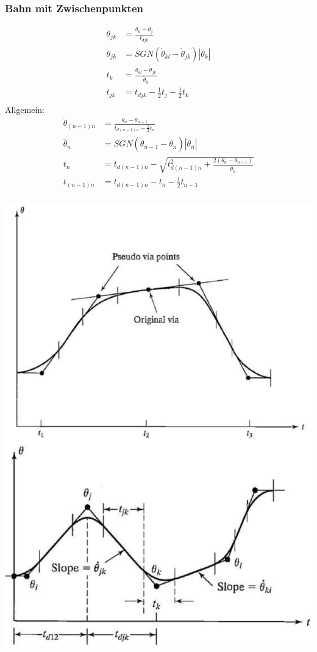 \subsubsection{Bahn mit Zwischenpunkten}
\begin{minipage}{0.5\linewidth}
    \begin{align*}
    \dot{\theta}_{jk} &= \frac{\theta_k - \theta_j}{t_{djk}}\\
    \ddot{\theta}_{jk} &= SGN(\dot{\theta}_{kl}-\dot{\theta}_{jk})|\ddot{\theta}_k|\\
    t_k &= \frac{\dot{\theta}_{kl}- \dot{\theta}_{jk}}{\ddot{\theta}_k}\\
    t_{jk}&=t_{djk}-\frac{1}{2}t_j - \frac{1}{2}t_k\\
    \end{align*}
    Allgemein:
    \begin{align*}
    \dot{\theta}_{(n-1)n} &= \frac{\theta_n - \theta_{n-1}}{t_{d(n-1)n}-\frac{1}{2}t_n}\\
    \ddot{\theta}_n &= SGN(\dot{\theta}_{n-1}-\dot{\theta}_{n})|\ddot{\theta}_n|\\
    t_n &= t_{d(n-1)n}-\sqrt{t^2_{d(n-1)n}+\frac{2(\theta_n - \theta_{n-1})}{\ddot{\theta}_n}}\\
    t_{(n-1)n} &= t_{d(n-1)n}-t_n - \frac{1}{2}t_{n-1}\\
    \end{align*}
\end{minipage}
\begin{minipage}{0.5\linewidth}
    \includegraphics[width=0.9\linewidth]{./bilder/BahnMitZP}
\end{minipage}
\clearpage
